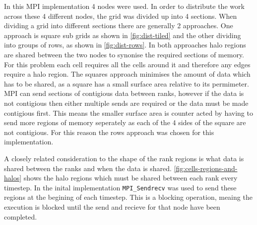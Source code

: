 \documentclass{article}
\begin{document}
\begin{multicols}{2}
In this MPI implementation 4 nodes were used. In order to distribute the work
across these 4 different nodes, the grid was divided up into 4 sections. When
dividing a grid into different sections there are generally 2 approaches. One approach is
square sub grids as shown in \autoref{fig:dist-tiled} and the other dividing
into groups of rows, as shown in \autoref{fig:dist-rows}. In both approaches
halo regions are shared between the two nodes to synonise the required sections
of memory. For this problem each cell requires all the cells around it and
therefore any edges require a halo region. The squares approach minimises the
amount of data which has to be shared, as a square has a small surface area
relative to its permimeter. MPI can send sections of contigious data between
ranks, however if the data is not contigious then either multiple sends are
required or the data must be made contigious first. This means the smaller
surface area is counter acted by having to send more regions of memory
seperately as each of the 4 sides of the square are not contigious. For this
reason the rows approach was chosen for this implementation.

\begin{center}
\begin{multicols}{2}

\label{fig:dist-tiled}

\label{fig:dist-rows}

\end{multicols}
\end{center}

A closely related consideration to the shape of the rank regions is what data
is shared between the ranks and when the data is shared.
\autoref{fig:cells-regions-and-halos} shows the halo regions which must be
shared between each rank every timestep. In the inital implementation \verb|MPI_Sendrecv|
was used to send these regions at the begining of each timestep. This is a
blocking operation, meaing the execution is blocked until the send and recieve
for that node have been completed. 


\end{multicols}
\end{document}
